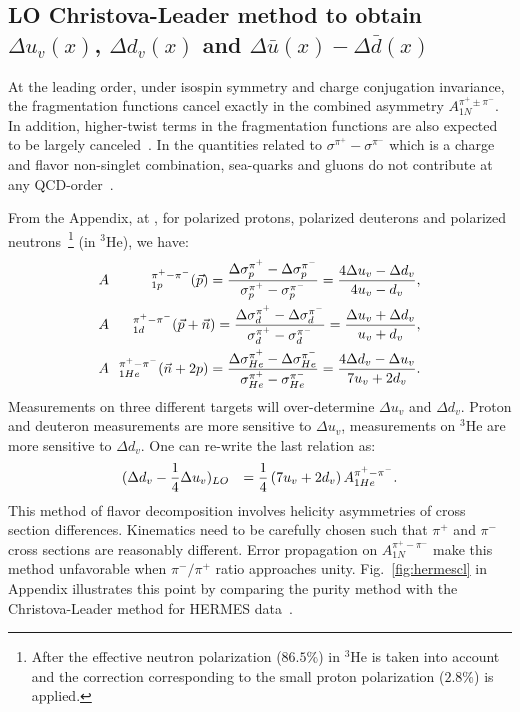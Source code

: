 \subsection{LO Christova-Leader method to obtain $\Delta u_v(x)$, $\Delta d_v(x)$ and $\Delta \bar{u}(x) - \Delta \bar{d}(x)$}
At the leading order, 
under isospin symmetry and charge conjugation invariance, the fragmentation functions 
cancel exactly in the combined asymmetry $A_{1N}^{\pi^+ \pm \pi^-}$. In addition, higher-twist 
terms in the fragmentation functions are also expected to be largely canceled~\cite{leader2}.
In the quantities related to $\sigma^{\pi^+} - \sigma^{\pi^-}$ which is a charge and flavor non-singlet
combination, sea-quarks and gluons do
not contribute at any QCD-order~\cite{leader2}.

From the Appendix, at \lo, for polarized 
protons, polarized deuterons and polarized neutrons~\footnote{After the effective neutron polarization ($86.5 \%$) 
in $^3$He is taken into account and the correction corresponding to the small 
proton polarization ($2.8 \%$) is applied.} (in $^3$He), we have:
\begin{eqnarray}
\label{eq:cllo}
&A&\hspace{-0.1cm}_{1p}^{\pi^+ - \pi^-}({\vec p})  =  { \Delta \sigma_p^{\pi^+}-\Delta \sigma_p^{\pi^-} \over
\sigma_p^{\pi^+} - \sigma_p^{\pi^-} }=
{  4\Delta u_v - \Delta d_v 
\over 4u_v - d_v }, \\
&A&\hspace{-0.1cm}_{1d}^{\pi^+ - \pi^-} ({\vec p}+ {\vec n}) =  { \Delta \sigma_d^{\pi^+}-\Delta \sigma_d^{\pi^-} \over
\sigma_d^{\pi^+}- \sigma_d^{\pi^-} }=
{ \Delta u_v + \Delta d_v 
\over u_v + d_v}, \\
&A&\hspace{-0.1cm}_{1He}^{\pi^+ - \pi^-} ({\vec n}+2p) =  { \Delta \sigma_{He}^{\pi^+}-\Delta \sigma_{He}^{\pi^-} \over
\sigma_{He}^{\pi^+}- \sigma_{He}^{\pi^-} }=
{ 4\Delta d_v - \Delta u_v 
\over 7 u_v + 2 d_v}. 
\end{eqnarray}
Measurements on three different targets will over-determine $\Delta u_v$ and $\Delta d_v$.
Proton and deuteron measurements are more sensitive to $\Delta u_v$, measurements on $^3$He  
are more sensitive
to $\Delta d_v$. One can re-write the last relation as:
\begin{eqnarray}
\label{Eq:cl2}
&(\Delta d_v-{1 \over 4} \Delta u_v )_{LO} &  = {1 \over 4} \left( 7 u_v + 2 d_v \right)  A_{1He}^{\pi^+ - \pi^-}.
\end{eqnarray}
This method of flavor decomposition involves helicity asymmetries of cross section differences. 
Kinematics need to be carefully chosen 
such that $\pi^+$ and $\pi^-$ cross sections are reasonably different.  
Error propagation on $A_{1N}^{\pi^+ - \pi^-}$ make this method unfavorable when $\pi^-/\pi^+$ ratio
approaches unity. Fig.~\ref{fig:hermescl}  in Appendix illustrates this point by comparing the purity method with
the Christova-Leader method for HERMES data~\cite{hermesthesis}.

